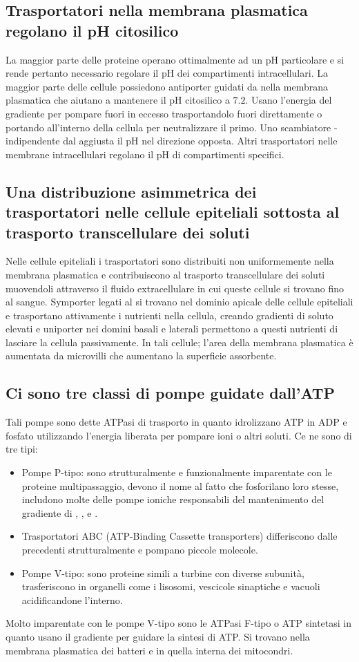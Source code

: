 \subsection{Trasportatori nella membrana plasmatica regolano il pH citosilico}
La maggior parte delle proteine operano ottimalmente ad un pH particolare e si rende pertanto necessario regolare il pH dei compartimenti intracellulari. La maggior parte delle cellule
possiedono antiporter guidati da  nella membrana plasmatica che aiutano a mantenere il pH citosilico a $7.2$. Usano l'energia del gradiente  per pompare fuori  in
eccesso trasportandolo fuori direttamente o portando all'interno della cellula  per neutralizzare il primo. Uno scambiatore - indipendente dal  
aggiusta il pH nel direzione opposta. Altri trasportatori nelle membrane intracellulari regolano il pH di compartimenti specifici.
\subsection{Una distribuzione asimmetrica dei trasportatori nelle cellule epiteliali sottosta al trasporto transcellulare dei soluti}
Nelle cellule epiteliali i trasportatori sono distribuiti non uniformemente nella membrana plasmatica e contribuiscono al trasporto transcellulare dei soluti muovendoli attraverso il 
fluido extracellulare in cui queste cellule si trovano fino al sangue. Symporter legati al  si trovano nel dominio apicale delle cellule epiteliali e trasportano attivamente i 
nutrienti nella cellula, creando gradienti  di soluto elevati e uniporter nei domini basali e laterali permettono a questi nutrienti di lasciare la cellula passivamente. In tali cellule;
l'area della membrana plasmatica \`e aumentata da microvilli che aumentano la superficie assorbente. 
\subsection{Ci sono tre classi di pompe guidate dall'ATP}
Tali pompe sono dette ATPasi di trasporto in quanto idrolizzano ATP in ADP e fosfato utilizzando l'energia liberata per pompare ioni o altri soluti. Ce ne sono di tre tipi:
\begin{itemize}
	\item Pompe P-tipo: sono strutturalmente e funzionalmente imparentate con le proteine multipassaggio, devono il nome al fatto che fosforilano loro stesse, includono molte delle 
		pompe ioniche responsabili del mantenimento del gradiente di , ,  e .
	\item Trasportatori ABC (ATP-Binding Cassette transporters) differiscono dalle precedenti strutturalmente e pompano piccole molecole.
	\item Pompe V-tipo: sono proteine simili a turbine con diverse subunit\`a, trasferiscono  in organelli come i lisosomi, vescicole sinaptiche e vacuoli acidificandone
		l'interno.
\end{itemize}
Molto imparentate con le pompe V-tipo sono le ATPasi F-tipo o ATP sintetasi in quanto usano il gradiente  per guidare la sintesi di ATP. Si trovano nella membrana plasmatica dei
batteri e in quella interna dei mitocondri. 
